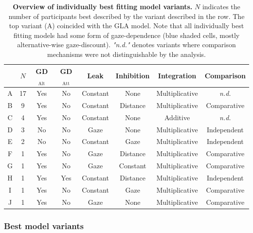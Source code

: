 \documentclass[11pt, a4paper]{article}
\begin{document}
\begin{table}[ht!]
\centering
\begin{tabular}{@{}cccccccc@{}}
\toprule
 & \textbf{$N$} & \textbf{GD$_{\text{Alt}}$} & \textbf{GD$_{\text{Att}}$} & \textbf{Leak} & \textbf{Inhibition} & \textbf{Integration} & \textbf{Comparison} \\ \midrule
A & 17 & \cellcolor[HTML]{DAE8FC}Yes & No & Constant & None & Multiplicative & \textit{n.d.} \\
B & 9 & \cellcolor[HTML]{DAE8FC}Yes & No & Constant & Distance & Multiplicative & Comparative \\
C & 4 & \cellcolor[HTML]{DAE8FC}Yes & No & Constant & None & Additive & \textit{n.d.} \\
D & 3 & No & No & \cellcolor[HTML]{DAE8FC}Gaze & None & Multiplicative & Independent \\
E & 2 & No & No & Constant & \cellcolor[HTML]{DAE8FC}Gaze & Multiplicative & Independent \\
F & 1 & \cellcolor[HTML]{DAE8FC}Yes & No & \cellcolor[HTML]{DAE8FC}Gaze & Distance & Multiplicative & Comparative \\
G & 1 & \cellcolor[HTML]{DAE8FC}Yes & No & \cellcolor[HTML]{DAE8FC}Gaze & Constant & Multiplicative & Comparative \\
H & 1 & \cellcolor[HTML]{DAE8FC}Yes & \cellcolor[HTML]{DAE8FC}Yes & Constant & Distance & Multiplicative & Independent \\
I & 1 & \cellcolor[HTML]{DAE8FC}Yes & No & Constant & \cellcolor[HTML]{DAE8FC}Gaze & Multiplicative & Comparative \\
J & 1 & \cellcolor[HTML]{DAE8FC}Yes & No & \cellcolor[HTML]{DAE8FC}Gaze & None & Multiplicative & Comparative \\ \bottomrule
\end{tabular}
\caption{\textbf{Overview of individually best fitting model variants.} $N$ indicates the number of participants best described by the variant described in the row. The top variant (A) coincided with the GLA model. Note that all individually best fitting models had some form of gaze-dependence (blue shaded cells, mostly alternative-wise gaze-discount). \emph{"n.d."} denotes variants where comparison mechanisms were not distinguishable by the analysis.}
\label{tab:switchboard-best-ind}
\end{table}

\subsubsection*{Best model variants}
\end{document}
